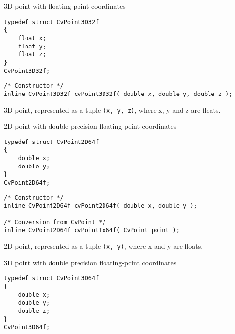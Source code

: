 \label{CvPoint3D32f}
3D point with floating-point coordinates

\ifC %
\begin{lstlisting}
typedef struct CvPoint3D32f
{
    float x; 
    float y; 
    float z; 
}
CvPoint3D32f;
\end{lstlisting}

\begin{description}
\end{description}

\begin{lstlisting}
/* Constructor */
inline CvPoint3D32f cvPoint3D32f( double x, double y, double z );
\end{lstlisting}
\else %
3D point, represented as a tuple \texttt{(x, y, z)}, where x, y and z are floats.
\fi %

\label{CvPoint2D64f}
2D point with double precision floating-point coordinates

\ifC %
\begin{lstlisting}
typedef struct CvPoint2D64f
{
    double x; 
    double y; 
}
CvPoint2D64f;
\end{lstlisting}

\begin{description}
\end{description}

\begin{lstlisting}
/* Constructor */
inline CvPoint2D64f cvPoint2D64f( double x, double y );

/* Conversion from CvPoint */
inline CvPoint2D64f cvPointTo64f( CvPoint point );
\end{lstlisting}
\else %
2D point, represented as a tuple \texttt{(x, y)}, where x and y are floats.
\fi %

\label{CvPoint3D64f}
3D point with double precision floating-point coordinates

\ifC %
\begin{lstlisting}
typedef struct CvPoint3D64f
{
    double x; 
    double y; 
    double z; 
}
CvPoint3D64f;
\end{lstlisting}

\begin{description}
\end{description}


